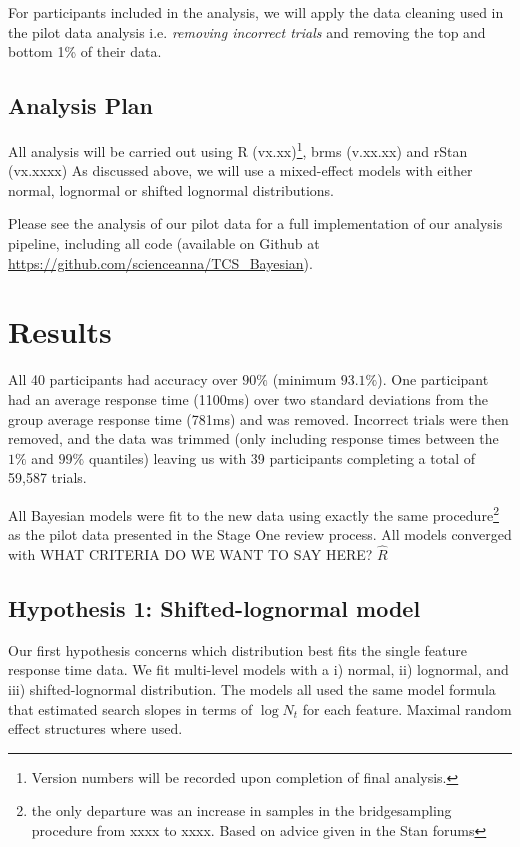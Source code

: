 \documentclass[preprint,12pt,authoryear]{elsarticle}
\begin{document}
For participants included in the analysis, we will apply the data cleaning used in the pilot data analysis i.e. \textit{removing incorrect trials} and removing the top and bottom 1\% of their data.

\subsection{Analysis Plan}

All analysis will be carried out using R (vx.xx)\footnote{Version numbers will be recorded upon completion of final analysis.}, brms (v.xx.xx) and rStan (vx.xxxx) As discussed above, we will use a mixed-effect models with either normal, lognormal or shifted lognormal distributions. 

Please see the analysis of our pilot data for a full implementation of our analysis pipeline, including all code (available on Github at  
\url{https://github.com/scienceanna/TCS_Bayesian}).


\section{Results}

All 40 participants had accuracy over $90\%$ (minimum $93.1\%$). One participant had an average response time (1100ms) over two standard deviations from the group average response time (781ms) and was removed. Incorrect trials were then removed, and the data was trimmed (only including response times between the $1\%$ and $99\%$ quantiles) leaving us with 39 participants completing a total of 59,587 trials.

All Bayesian models were fit to the new data using exactly the same procedure\footnote{the only departure was an increase in samples in the bridgesampling procedure from xxxx to xxxx. Based on advice given in the Stan forums} as the pilot data presented in the Stage One review process. All models converged with WHAT CRITERIA DO WE WANT TO SAY HERE? $\hat{R}$

\subsection{Hypothesis 1: Shifted-lognormal model}

Our first hypothesis concerns which distribution best fits the single feature response time data. We fit multi-level models with
a i) normal, ii) lognormal, and iii) shifted-lognormal distribution. The models all used the same model formula that estimated search slopes in terms of $\log{N_t}$ for each feature. Maximal random effect structures where used. 
\end{document}
